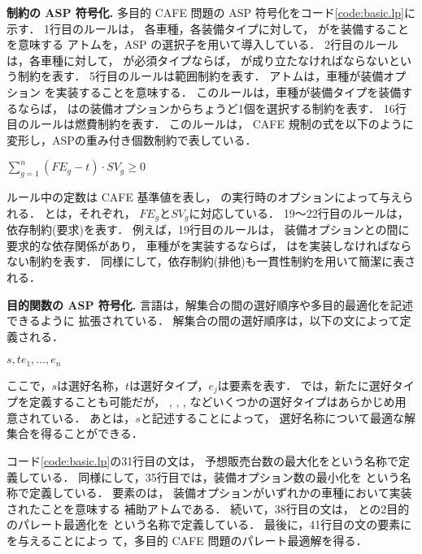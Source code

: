\textbf{制約の ASP 符号化.}
多目的 CAFE 問題の ASP 符号化をコード\ref{code:basic.lp}に示す．
%
1行目のルールは，
各車種，各装備タイプに対して，
がを装備することを意味する
アトムを，ASP の選択子を用いて導入している．
%
2行目のルールは，各車種に対して，
が必須タイプならば，
が成り立たなければならないという制約を表す．
%
5行目のルールは範囲制約を表す．
アトムは，車種が装備オプション
を実装することを意味する．
このルールは，車種が装備タイプを装備するならば，
はの装備オプションからちょうど1個を選択する制約を表す．
%
16行目のルールは燃費制約を表す．
このルールは，
CAFE 規制の式を以下のように変形し，ASPの重み付き個数制約で表している．
\begin{center}
\(\sum_{g=1}^{n} (FE_{g}-t)\cdot SV_{g} \geq 0\)  
\end{center}
ルール中の定数は CAFE 基準値を表し，
{\asprin}の実行時のオプションによって与えられる．
とは，それぞれ，
$FE_{g}$と$SV_{g}$に対応している．
%
19〜22行目のルールは，依存制約(要求)を表す．
例えば，19行目のルールは，
装備オプションとの間に要求的な依存関係があり，
車種がを実装するならば，
はを実装しなければならない制約を表す．
同様にして，依存制約(排他)も一貫性制約を用いて簡潔に表される．

\textbf{目的関数の ASP 符号化.}
{\asprin}言語は，解集合の間の選好順序や多目的最適化を記述できるように
拡張されている．
解集合の間の選好順序は，以下の文によって定義される．
\begin{center}
  $s,t$\code{)\{}$e_1,\dots,e_n$
\end{center}
ここで，$s$は選好名称，$t$は選好タイプ，$e_j$は要素を表す．
{\asprin} では，新たに選好タイプを定義することも可能だが，
, 
,
,
などいくつかの選好タイプはあらかじめ用意されている．
あとは，$s$\code{)}と記述することによって，
選好名称について最適な解集合を得ることができる．

コード\ref{code:basic.lp}の31行目の文は，
予想販売台数の最大化をという名称で定義している．
同様にして，35行目では，装備オプション数の最小化を
という名称で定義している．
要素のは，
装備オプションがいずれかの車種において実装されたことを意味する
補助アトムである．
続いて，38行目の文は，
との2目的のパレート最適化を
という名称で定義している．
最後に，41行目の文の要素にを与えることによっ
て，多目的 CAFE 問題のパレート最適解を得る．

